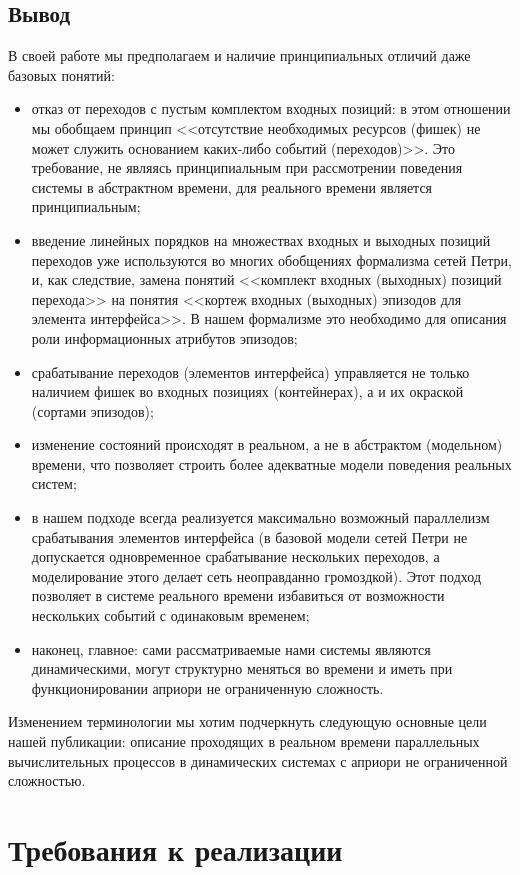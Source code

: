 \section{Вывод}
В своей работе мы предполагаем и наличие принципиальных отличий даже базовых понятий: 
\begin{itemize}
	\item отказ от переходов с пустым комплектом входных позиций: в этом отношении мы обобщаем принцип <<отсутствие необходимых ресурсов (фишек) не может служить основанием каких-либо событий (переходов)>>. Это требование, не являясь принципиальным при рассмотрении поведения системы в абстрактном времени, для реального времени является принципиальным;
	\item введение линейных порядков на множествах входных и выходных позиций переходов уже используются во многих обобщениях формализма сетей Петри, и, как следствие, замена понятий <<комплект входных (выходных) позиций перехода>> на понятия <<кортеж входных (выходных) эпизодов для элемента интерфейса>>. В  нашем формализме это необходимо для описания роли информационных атрибутов эпизодов;
	\item срабатывание переходов (элементов интерфейса) управляется не только наличием фишек во входных позициях (контейнерах), а и их окраской (сортами эпизодов);
	\item изменение состояний происходят в реальном, а не в абстрактом (модельном) времени, что позволяет строить более адекватные модели поведения реальных систем;
	\item в нашем подходе всегда реализуется максимально возможный параллелизм срабатывания элементов интерфейса (в базовой модели сетей Петри не допускается одновременное срабатывание нескольких переходов, а моделирование этого делает сеть неоправданно громоздкой). Этот подход позволяет в системе реального времени избавиться от возможности нескольких событий с одинаковым временем;
	\item наконец, главное: сами рассматриваемые нами системы являются динамическими, могут структурно меняться во времени и иметь при функционировании априори не ограниченную сложность.
\end{itemize}

Изменением терминологии мы хотим подчеркнуть следующую основные цели нашей публикации: описание проходящих в реальном времени параллельных вычислительных процессов в динамических системах с априори не ограниченной сложностью.\cite{Falk}

\chapter{Требования к реализации}
